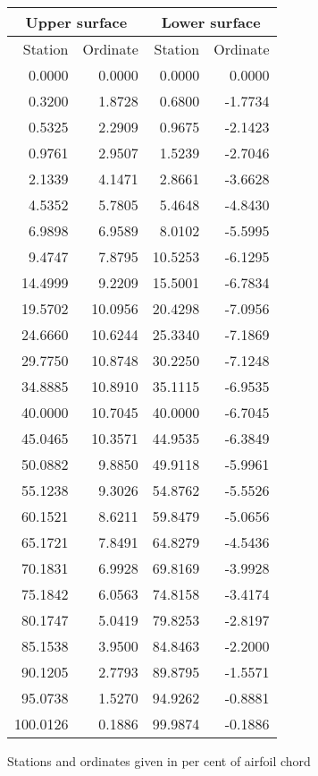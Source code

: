\documentclass[11pt]{book}
\begin{document}
 \hspace{4mm}
 \begin{tabular}{|r|r|r|r|} \hline 
 \multicolumn{2}{|c|}{Upper surface} & \multicolumn{2}{|c|}{Lower surface} \\
 \hline
 Station & Ordinate & Station & Ordinate \\
 \hline
0.0000 & 0.0000 & 0.0000 & 0.0000 \\
0.3200 & 1.8728 & 0.6800 & -1.7734 \\
0.5325 & 2.2909 & 0.9675 & -2.1423 \\
0.9761 & 2.9507 & 1.5239 & -2.7046 \\
2.1339 & 4.1471 & 2.8661 & -3.6628 \\
4.5352 & 5.7805 & 5.4648 & -4.8430 \\
6.9898 & 6.9589 & 8.0102 & -5.5995 \\
9.4747 & 7.8795 & 10.5253 & -6.1295 \\
14.4999 & 9.2209 & 15.5001 & -6.7834 \\
19.5702 & 10.0956 & 20.4298 & -7.0956 \\
24.6660 & 10.6244 & 25.3340 & -7.1869 \\
29.7750 & 10.8748 & 30.2250 & -7.1248 \\
34.8885 & 10.8910 & 35.1115 & -6.9535 \\
40.0000 & 10.7045 & 40.0000 & -6.7045 \\
45.0465 & 10.3571 & 44.9535 & -6.3849 \\
50.0882 & 9.8850 & 49.9118 & -5.9961 \\
55.1238 & 9.3026 & 54.8762 & -5.5526 \\
60.1521 & 8.6211 & 59.8479 & -5.0656 \\
65.1721 & 7.8491 & 64.8279 & -4.5436 \\
70.1831 & 6.9928 & 69.8169 & -3.9928 \\
75.1842 & 6.0563 & 74.8158 & -3.4174 \\
80.1747 & 5.0419 & 79.8253 & -2.8197 \\
85.1538 & 3.9500 & 84.8463 & -2.2000 \\
90.1205 & 2.7793 & 89.8795 & -1.5571 \\
95.0738 & 1.5270 & 94.9262 & -0.8881 \\
100.0126 & 0.1886 & 99.9874 & -0.1886 \\
 \hline 
 \end{tabular}
 \vspace{8mm}

Stations and ordinates given in per cent of airfoil chord
\end{document}
